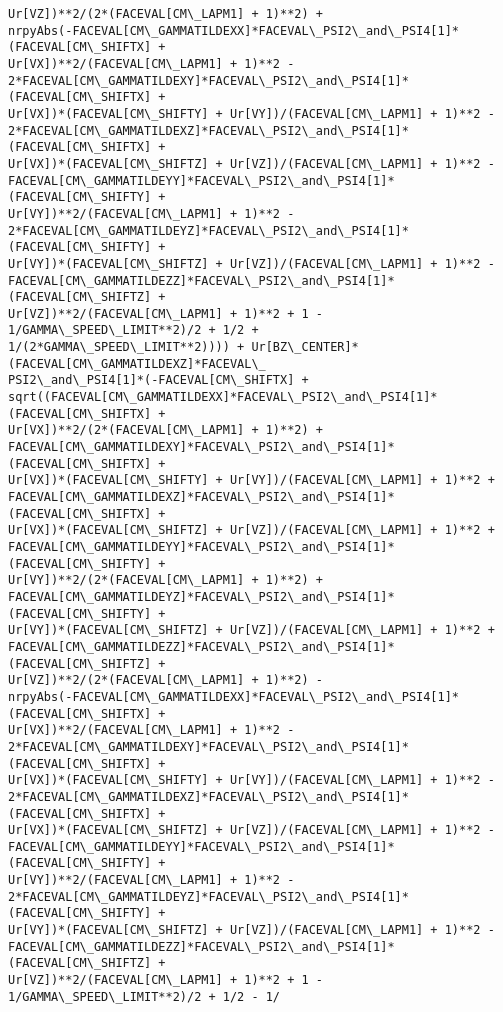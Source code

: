 \documentclass[landscape,letterpaper,10pt,english]{article}
\begin{document}
\begin{Verbatim}[commandchars=\\\{\}]
Ur[VZ])**2/(2*(FACEVAL[CM\_LAPM1] + 1)**2) +
nrpyAbs(-FACEVAL[CM\_GAMMATILDEXX]*FACEVAL\_PSI2\_and\_PSI4[1]*(FACEVAL[CM\_SHIFTX] +
Ur[VX])**2/(FACEVAL[CM\_LAPM1] + 1)**2 -
2*FACEVAL[CM\_GAMMATILDEXY]*FACEVAL\_PSI2\_and\_PSI4[1]*(FACEVAL[CM\_SHIFTX] +
Ur[VX])*(FACEVAL[CM\_SHIFTY] + Ur[VY])/(FACEVAL[CM\_LAPM1] + 1)**2 -
2*FACEVAL[CM\_GAMMATILDEXZ]*FACEVAL\_PSI2\_and\_PSI4[1]*(FACEVAL[CM\_SHIFTX] +
Ur[VX])*(FACEVAL[CM\_SHIFTZ] + Ur[VZ])/(FACEVAL[CM\_LAPM1] + 1)**2 -
FACEVAL[CM\_GAMMATILDEYY]*FACEVAL\_PSI2\_and\_PSI4[1]*(FACEVAL[CM\_SHIFTY] +
Ur[VY])**2/(FACEVAL[CM\_LAPM1] + 1)**2 -
2*FACEVAL[CM\_GAMMATILDEYZ]*FACEVAL\_PSI2\_and\_PSI4[1]*(FACEVAL[CM\_SHIFTY] +
Ur[VY])*(FACEVAL[CM\_SHIFTZ] + Ur[VZ])/(FACEVAL[CM\_LAPM1] + 1)**2 -
FACEVAL[CM\_GAMMATILDEZZ]*FACEVAL\_PSI2\_and\_PSI4[1]*(FACEVAL[CM\_SHIFTZ] +
Ur[VZ])**2/(FACEVAL[CM\_LAPM1] + 1)**2 + 1 - 1/GAMMA\_SPEED\_LIMIT**2)/2 + 1/2 +
1/(2*GAMMA\_SPEED\_LIMIT**2)))) + Ur[BZ\_CENTER]*(FACEVAL[CM\_GAMMATILDEXZ]*FACEVAL\_
PSI2\_and\_PSI4[1]*(-FACEVAL[CM\_SHIFTX] +
sqrt((FACEVAL[CM\_GAMMATILDEXX]*FACEVAL\_PSI2\_and\_PSI4[1]*(FACEVAL[CM\_SHIFTX] +
Ur[VX])**2/(2*(FACEVAL[CM\_LAPM1] + 1)**2) +
FACEVAL[CM\_GAMMATILDEXY]*FACEVAL\_PSI2\_and\_PSI4[1]*(FACEVAL[CM\_SHIFTX] +
Ur[VX])*(FACEVAL[CM\_SHIFTY] + Ur[VY])/(FACEVAL[CM\_LAPM1] + 1)**2 +
FACEVAL[CM\_GAMMATILDEXZ]*FACEVAL\_PSI2\_and\_PSI4[1]*(FACEVAL[CM\_SHIFTX] +
Ur[VX])*(FACEVAL[CM\_SHIFTZ] + Ur[VZ])/(FACEVAL[CM\_LAPM1] + 1)**2 +
FACEVAL[CM\_GAMMATILDEYY]*FACEVAL\_PSI2\_and\_PSI4[1]*(FACEVAL[CM\_SHIFTY] +
Ur[VY])**2/(2*(FACEVAL[CM\_LAPM1] + 1)**2) +
FACEVAL[CM\_GAMMATILDEYZ]*FACEVAL\_PSI2\_and\_PSI4[1]*(FACEVAL[CM\_SHIFTY] +
Ur[VY])*(FACEVAL[CM\_SHIFTZ] + Ur[VZ])/(FACEVAL[CM\_LAPM1] + 1)**2 +
FACEVAL[CM\_GAMMATILDEZZ]*FACEVAL\_PSI2\_and\_PSI4[1]*(FACEVAL[CM\_SHIFTZ] +
Ur[VZ])**2/(2*(FACEVAL[CM\_LAPM1] + 1)**2) -
nrpyAbs(-FACEVAL[CM\_GAMMATILDEXX]*FACEVAL\_PSI2\_and\_PSI4[1]*(FACEVAL[CM\_SHIFTX] +
Ur[VX])**2/(FACEVAL[CM\_LAPM1] + 1)**2 -
2*FACEVAL[CM\_GAMMATILDEXY]*FACEVAL\_PSI2\_and\_PSI4[1]*(FACEVAL[CM\_SHIFTX] +
Ur[VX])*(FACEVAL[CM\_SHIFTY] + Ur[VY])/(FACEVAL[CM\_LAPM1] + 1)**2 -
2*FACEVAL[CM\_GAMMATILDEXZ]*FACEVAL\_PSI2\_and\_PSI4[1]*(FACEVAL[CM\_SHIFTX] +
Ur[VX])*(FACEVAL[CM\_SHIFTZ] + Ur[VZ])/(FACEVAL[CM\_LAPM1] + 1)**2 -
FACEVAL[CM\_GAMMATILDEYY]*FACEVAL\_PSI2\_and\_PSI4[1]*(FACEVAL[CM\_SHIFTY] +
Ur[VY])**2/(FACEVAL[CM\_LAPM1] + 1)**2 -
2*FACEVAL[CM\_GAMMATILDEYZ]*FACEVAL\_PSI2\_and\_PSI4[1]*(FACEVAL[CM\_SHIFTY] +
Ur[VY])*(FACEVAL[CM\_SHIFTZ] + Ur[VZ])/(FACEVAL[CM\_LAPM1] + 1)**2 -
FACEVAL[CM\_GAMMATILDEZZ]*FACEVAL\_PSI2\_and\_PSI4[1]*(FACEVAL[CM\_SHIFTZ] +
Ur[VZ])**2/(FACEVAL[CM\_LAPM1] + 1)**2 + 1 - 1/GAMMA\_SPEED\_LIMIT**2)/2 + 1/2 - 1/

\end{Verbatim}
\end{document}
